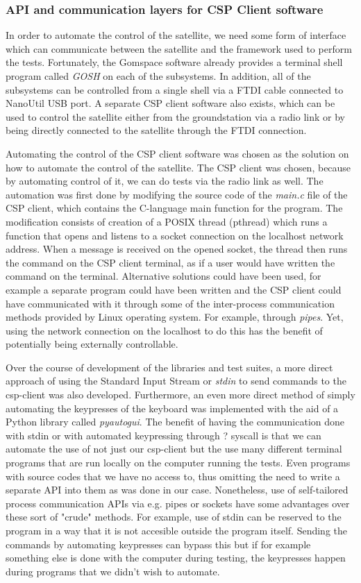 \documentclass[english,12pt,a4paper,pdftex,elec,utf8]{aaltothesis}
\begin{document}
\subsubsection{API and communication layers for CSP Client software}
In order to automate the control of the satellite, we need some form of interface which can
communicate between the satellite and the framework used to perform the tests.
Fortunately, the Gomspace software already provides a terminal shell program called \textit{GOSH} on each of the subsystems. In addition, all of the subsystems can be controlled from a single shell via a FTDI cable connected to NanoUtil USB port. A separate CSP client
software also exists, which can be used to control the satellite either from the 
groundstation via a radio link or by being directly connected to the satellite through the
FTDI connection.\par
Automating the control of the CSP client software was chosen as the solution on how to 
automate the control of the satellite. The CSP client was chosen, because by automating
control of it, we can do tests via the radio link as well. The automation was first done by
modifying the source code of the \textit{main.c} file of the CSP client, which contains the C-language main function for the program. The modification consists of creation of a POSIX thread (pthread) which runs a function that opens and listens to a socket connection on the localhost network address. When a message is received on the opened socket, the thread then runs the command on the CSP client terminal, as if a user would have written the command on the terminal. Alternative solutions could have been used, for example a separate program could have been written and the CSP client could have communicated with it through some of the inter-process communication methods provided by Linux operating system. For example, through \textit{pipes}. Yet, using the network connection on the localhost to do this has the benefit of potentially being externally controllable.\par 
Over the course of development of the libraries and test suites, a more direct approach of using the Standard Input Stream or \textit{stdin} to send commands to the csp-client was also developed. Furthermore, an even more direct method of simply automating the keypresses of the keyboard was implemented with the aid of a Python library called \textit{pyautogui}. The benefit of having the communication done with stdin or with automated keypressing through ? syscall is that we can automate the use of not just our csp-client but the use many different terminal programs that are run locally on the computer running the tests. Even programs with source codes that we have no access to, thus omitting the need to write a separate API into them as was done in our case. Nonetheless, use of self-tailored process communication APIs via e.g. pipes or sockets have some advantages over these sort of "crude" methods. For example, use of stdin can be reserved to the program in a way that it is not accesible outside the program itself. Sending the commands by automating keypresses can bypass this but if for example something else is done with the computer during testing, the keypresses happen during programs that we didn't wish to automate.\par
\end{document}
